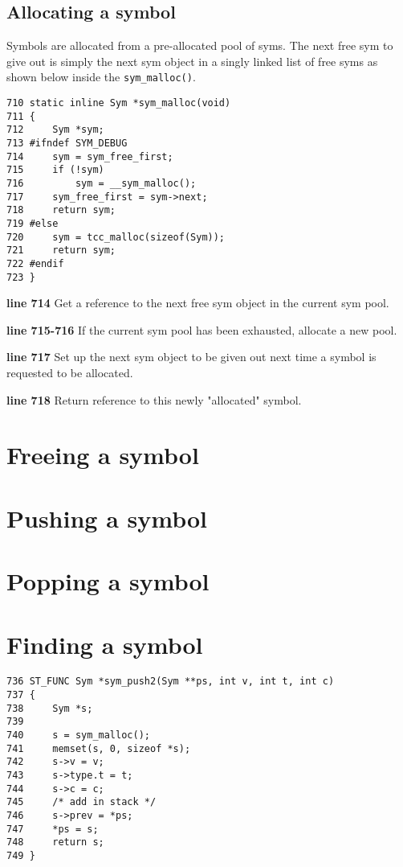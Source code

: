 \subsection{Allocating a symbol}
Symbols are allocated from a pre-allocated pool of syms. The next free sym to give out is simply the next sym object in a singly linked list of free syms as shown below inside the \verb|sym_malloc()|.


\begin{verbatim}
710 static inline Sym *sym_malloc(void)
711 {
712     Sym *sym;
713 #ifndef SYM_DEBUG
714     sym = sym_free_first;
715     if (!sym)
716         sym = __sym_malloc();
717     sym_free_first = sym->next;
718     return sym;
719 #else
720     sym = tcc_malloc(sizeof(Sym));
721     return sym;
722 #endif
723 }
\end{verbatim}
\begin{tcc_desc}
\textbf{line 714} Get a reference to the next free sym object in the current sym pool.

\textbf{line 715-716} If the current sym pool has been exhausted, allocate a new pool.

\textbf{line 717} Set up the next sym object to be given out next time a symbol is requested to be allocated.

\textbf{line 718} Return reference to this newly "allocated" symbol.
\end{tcc_desc}

\section{Freeing a symbol}

\section{Pushing a symbol}

\section{Popping a symbol}

\section{Finding a symbol}

\begin{verbatim}
736 ST_FUNC Sym *sym_push2(Sym **ps, int v, int t, int c)
737 {
738     Sym *s;
739 
740     s = sym_malloc();
741     memset(s, 0, sizeof *s);
742     s->v = v;
743     s->type.t = t;
744     s->c = c;
745     /* add in stack */
746     s->prev = *ps;
747     *ps = s;
748     return s;
749 }
\end{verbatim}

